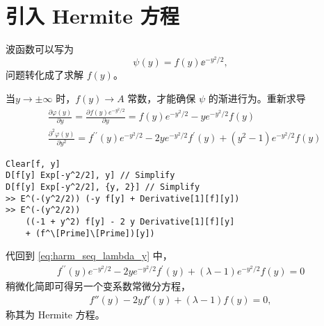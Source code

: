 \section{引入 Hermite 方程}
波函数可以写为
\begin{equation}
    \psi(y) = f(y) \ee^{-y^2/2},
\end{equation}
问题转化成了求解 $f(y)$。

当$y\rightarrow\pm\infty$ 时，$f(y) \rightarrow A$ 常数，才能确保 $\psi$ 的渐进行为。重新求导 
\begin{align}
    &\frac{\partial \varphi(y)}{\partial y}=\frac{\partial f(y) e^{-y^2/2}}{\partial y}=f(y) e^{-y^2 / 2}-y e^{-y^2 / 2} f(y) \\
    &\frac{\partial^2 \varphi(y)}{\partial y^2}=f^{\prime \prime}(y) e^{-y^2 / 2}-2 y e^{-y^2 / 2} f^{\prime}(y)+\left(y^2-1\right) e^{-y^2 / 2} f(y)
\end{align}
\begin{lstlisting}
Clear[f, y]
D[f[y] Exp[-y^2/2], y] // Simplify
D[f[y] Exp[-y^2/2], {y, 2}] // Simplify
>> E^(-(y^2/2)) (-y f[y] + Derivative[1][f][y])
>> E^(-(y^2/2)) 
    ((-1 + y^2) f[y] - 2 y Derivative[1][f][y] 
    + (f^\[Prime]\[Prime])[y])
\end{lstlisting}
代回到 \eqref{eq:harm_seq_lambda_y} 中，
\begin{align}
    f^{\prime \prime}(y) e^{-y^2 / 2}-2 y e^{-y^2 / 2} f^{\prime}(y)+(\lambda-1) e^{-y^2 / 2} f(y)=0
\end{align}
稍微化简即可得另一个变系数常微分方程，
\begin{align}
    f''(y) - 2y f'(y) + (\lambda - 1) f(y) = 0, 
    \label{eq:harm_lambda_y_simp} %
\end{align}
称其为 Hermite 方程。


